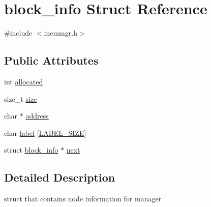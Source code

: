 \hypertarget{structblock__info}{\section{block\-\_\-info Struct Reference}
\label{structblock__info}
}


{\ttfamily \#include $<$memmgr.\-h$>$}

\subsection*{Public Attributes}
\begin{DoxyCompactItemize}
\item 
int \hyperlink{structblock__info_ac7ebfcc525f05b3067a904edd80ba719}{allocated}
\item 
size\-\_\-t \hyperlink{structblock__info_abac2385c3bac00c3eb8233dc0b30f7c3}{size}
\item 
char $\ast$ \hyperlink{structblock__info_a36c04dc53118712a6693cf467076c40e}{address}
\item 
char \hyperlink{structblock__info_a798c0e0609ee53eaa87fc617f757ee83}{label} \mbox{[}\hyperlink{memmgr_8h_acd040791772dfe1d7ee535fcffbde41e}{L\-A\-B\-E\-L\-\_\-\-S\-I\-Z\-E}\mbox{]}
\item 
struct \hyperlink{structblock__info}{block\-\_\-info} $\ast$ \hyperlink{structblock__info_a76caf485f1f56802a894c7902612ad22}{next}
\end{DoxyCompactItemize}


\subsection{Detailed Description}
struct that contains node information for manager 

